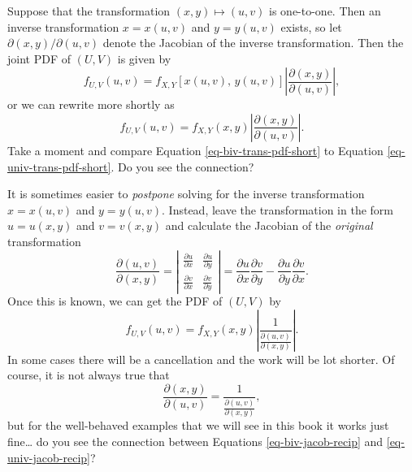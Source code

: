 \documentclass[captions=tableheading]{scrbook}
\begin{document}
Suppose that the transformation \((x,y)\longmapsto(u,v)\) is one-to-one. Then an inverse transformation \(x=x(u,v)\) and \(y=y(u,v)\) exists, so let \(\partial(x,y)/\partial(u,v)\) denote the Jacobian of the inverse transformation. Then the joint PDF of \((U,V)\) is given by 
\begin{equation}
f_{U,V}(u,v)=f_{X,Y}\left[x(u,v),\, y(u,v)\right]\left|\frac{\partial(x,y)}{\partial(u,v)}\right|,
\end{equation}
or we can rewrite more shortly as
\begin{equation}
f_{U,V}(u,v)=f_{X,Y}(x,y)\left|\frac{\partial(x,y)}{\partial(u,v)}\right|.\label{eq-biv-trans-pdf-short}
\end{equation}
Take a moment and compare Equation \ref{eq-biv-trans-pdf-short} to Equation \ref{eq-univ-trans-pdf-short}. Do you see the connection? 

\begin{rem}
It is sometimes easier to \emph{postpone} solving for the inverse transformation \(x=x(u,v)\) and \(y=y(u,v)\). Instead, leave the transformation in the form \(u=u(x,y)\) and \(v=v(x,y)\) and calculate the Jacobian of the \emph{original} transformation
\begin{equation}
\frac{\partial(u,v)}{\partial(x,y)}=\left|\begin{array}{cc}
\frac{\partial u}{\partial x} & \frac{\partial u}{\partial y}\\
\frac{\partial v}{\partial x} & \frac{\partial v}{\partial y}\end{array}\right|=\frac{\partial u}{\partial x}\frac{\partial v}{\partial y}-\frac{\partial u}{\partial y}\frac{\partial v}{\partial x}.
\end{equation}
Once this is known, we can get the PDF of \((U,V)\) by
\begin{equation}
f_{U,V}(u,v)=f_{X,Y}(x,y)\left|\frac{1}{\frac{\partial(u,v)}{\partial(x,y)}}\right|.
\end{equation}
In some cases there will be a cancellation and the work will be lot shorter. Of course, it is not always true that
\begin{equation}
\frac{\partial(x,y)}{\partial(u,v)}=\frac{1}{\frac{\partial(u,v)}{\partial(x,y)}},\label{eq-biv-jacob-recip}
\end{equation}
but for the well-behaved examples that we will see in this book it works just fine\ldots{} do you see the connection between Equations \ref{eq-biv-jacob-recip} and \ref{eq-univ-jacob-recip}?
\end{rem}
\end{document}
